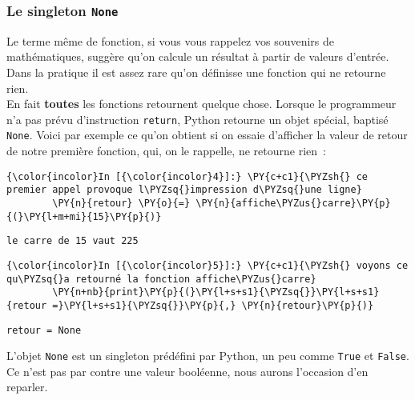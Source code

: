     \hypertarget{le-singleton-none}{%
\subsubsection{\texorpdfstring{Le singleton
\texttt{None}}{Le singleton None}}\label{le-singleton-none}}

    Le terme même de fonction, si vous vous rappelez vos souvenirs de
mathématiques, suggère qu'on calcule un résultat à partir de valeurs
d'entrée. Dans la pratique il est assez rare qu'on définisse une
fonction qui ne retourne rien.\\

    En fait \textbf{toutes} les fonctions retournent quelque chose. Lorsque
le programmeur n'a pas prévu d'instruction \texttt{return}, Python
retourne un objet spécial, baptisé \texttt{None}. Voici par exemple ce
qu'on obtient si on essaie d'afficher la valeur de retour de notre
première fonction, qui, on le rappelle, ne retourne rien~:

    \begin{Verbatim}[commandchars=\\\{\}]
{\color{incolor}In [{\color{incolor}4}]:} \PY{c+c1}{\PYZsh{} ce premier appel provoque l\PYZsq{}impression d\PYZsq{}une ligne}
        \PY{n}{retour} \PY{o}{=} \PY{n}{affiche\PYZus{}carre}\PY{p}{(}\PY{l+m+mi}{15}\PY{p}{)}
\end{Verbatim}


    \begin{Verbatim}[commandchars=\\\{\}]
le carre de 15 vaut 225

    \end{Verbatim}

    \begin{Verbatim}[commandchars=\\\{\}]
{\color{incolor}In [{\color{incolor}5}]:} \PY{c+c1}{\PYZsh{} voyons ce qu\PYZsq{}a retourné la fonction affiche\PYZus{}carre}
        \PY{n+nb}{print}\PY{p}{(}\PY{l+s+s1}{\PYZsq{}}\PY{l+s+s1}{retour =}\PY{l+s+s1}{\PYZsq{}}\PY{p}{,} \PY{n}{retour}\PY{p}{)}
\end{Verbatim}


    \begin{Verbatim}[commandchars=\\\{\}]
retour = None

    \end{Verbatim}

    L'objet \texttt{None} est un singleton prédéfini par Python, un peu
comme \texttt{True} et \texttt{False}. Ce n'est pas par contre une
valeur booléenne, nous aurons l'occasion d'en reparler.

